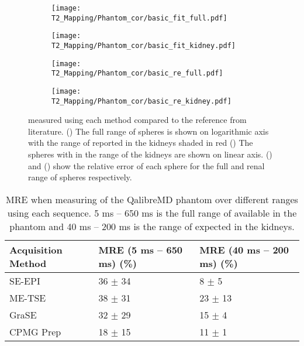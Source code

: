 \begin{figure}[H]
	\centering
	\begin{subfigure}[c]{0.47\textwidth}
		\centering
		\texttt{[image: T2\_Mapping/Phantom\_cor/basic\_fit\_full.pdf]}
		\caption{}
		\label{fig:t2_phantom_cor_full}
	\end{subfigure}
	\hfill
	\begin{subfigure}[c]{0.47\textwidth}
		\centering
		\texttt{[image: T2\_Mapping/Phantom\_cor/basic\_fit\_kidney.pdf]}
		\caption{}
		\label{fig:t2_phantom_cor_kidney}
	\end{subfigure}
	\vfill
		\begin{subfigure}[c]{0.47\textwidth}
		\centering
		\texttt{[image: T2\_Mapping/Phantom\_cor/basic\_re\_full.pdf]}
		\caption{}
		\label{fig:t2_phantom_re_full}
	\end{subfigure}
	\hfill
	\begin{subfigure}[c]{0.47\textwidth}
		\centering
		\texttt{[image: T2\_Mapping/Phantom\_cor/basic\_re\_kidney.pdf]}
		\caption{}
		\label{fig:t2_phantom_re_kidney}
	\end{subfigure}
	\caption{\ttwo measured using each method compared to the reference \ttwo from literature. () The full range of \ttwo spheres is shown on logarithmic axis with the range of \ttwo reported in the kidneys shaded in red () The spheres with \ttwo in the range of the kidneys are shown on linear axis. () and () show the relative error of each sphere for the full and renal range of spheres respectively.}
	\label{fig:t2_phantom_cor}
\end{figure}

\begin{table}[H]
	\centering
	\begin{tabularx}{1\textwidth}{X|X|X}
		Acquisition   Method & MRE   (5 ms – 650 ms) (\%) & MRE   (40 ms – 200 ms) (\%) \\ \hline
		SE-EPI               & 36 $\pm$ 34                    & 8   $\pm$ 5                     \\ \hline
		ME-TSE               & 38   $\pm$ 31                  & 23 $\pm$ 13                     \\ \hline
		GraSE                & 32 $\pm$ 29                    & 15   $\pm$ 4                    \\ \hline
		CPMG   \ttwo Prep       & 18   $\pm$ 15                  & 11   $\pm$ 1                   
	\end{tabularx}
	\caption{\ac{MRE} when measuring \ttwo of the QalibreMD phantom over different ranges using each sequence. 5 ms – 650 ms is the full range of \ttwo available in the phantom and 40 ms – 200 ms is the range of \ttwo expected in the kidneys.}
	\label{tab:t2_phantom_acquisition_methods}
\end{table}

